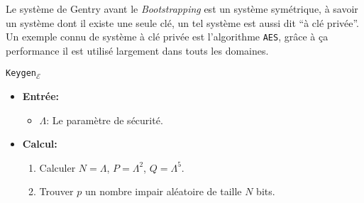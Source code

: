 Le système de Gentry avant le {\it Bootstrapping} est un système symétrique, à savoir un système dont il existe une seule clé, 
un tel système est aussi dit ``à clé privée''. Un exemple connu de système à clé privée
est l'algorithme \verb!AES!, grâce à ça performance il est utilisé largement dans touts les domaines. 

	\begin{algo}{\verb!Keygen!$_\mathcal{E}$}
		\begin{itemize}\renewcommand{\labelitemi}{} \renewcommand{\labelitemii}{$\cdot$}
			\item{\bf Entrée:} 
				\begin{itemize}
					\item $\Lambda$: Le paramètre de sécurité.
				\end{itemize}
			\item{\bf Calcul:}
				\begin{enumerate} %
				\renewcommand{\theenumi}{\arabic{enumi}}
				\renewcommand{\theenumii}{\arabic{enumii}}
				\renewcommand{\theenumiii}{\arabic{enumiii}}
				\renewcommand{\labelenumi}{\theenumi.}
				\renewcommand{\labelenumii}{\theenumi.\theenumii.}
				\renewcommand{\labelenumiii}{\theenumi.\theenumii.\theenumiii.}
				\makeatletter
				\renewcommand{\p@enumii}{\theenumi.}
				\renewcommand{\p@enumiii}{\theenumi.\theenumii.}
				\makeatother
					\item Calculer $N=\Lambda$, $P=\Lambda^2$, $Q=\Lambda^5$.
					\item Trouver $p$ un nombre impair aléatoire de taille $N$ bits.	
				\end{enumerate}

		\end{itemize}
	\end{algo}


